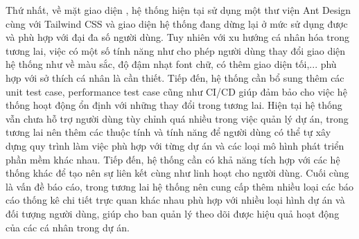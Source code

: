 \documentclass[../DoAn.tex]{subfiles}
\begin{document}
Thứ nhất, về mặt giao diện , hệ thống hiện tại sử dụng một thư viện Ant Design cùng với Tailwind CSS và giao diện hệ thống đang dừng lại ở mức
sử dụng được và phù hợp với đại đa số người dùng. Tuy nhiên với xu hướng cá nhân hóa trong tương lai, việc có một số tính năng như cho phép
người dùng thay đổi giao diện hệ thống như về màu sắc, độ đậm nhạt font chữ, có thêm giao diện tối,... phù hợp với sở thích cá nhân là cần thiết.
Tiếp đến, hệ thống cần bổ sung thêm các unit test case, performance test case cũng như CI/CD giúp đảm bảo cho việc hệ thống hoạt động ổn định
với những thay đổi trong tương lai. Hiện tại hệ thống vẫn chưa hỗ trợ người dùng tùy chỉnh quá nhiều trong việc quản lý dự án,
trong tương lai nên thêm các thuộc tính và tính năng để người dùng có thể tự xây dựng quy trình làm việc phù hợp với từng dự án và
các loại mô hình phát triển phần mềm khác nhau. Tiếp đến, hệ thống cần có khả năng tích hợp với các hệ thống khác để tạo nên sự liên kết
cùng như linh hoạt cho người dùng. Cuối cùng là vấn đề báo cáo, trong tương lai hệ thống nên cung cấp thêm nhiều loại các báo cáo thống kê
chi tiết trực quan khác nhau phù hợp với nhiều loại hình dự án và đối tượng người dùng, giúp cho ban quản lý theo dõi được hiệu quả hoạt động
của các cá nhân trong dự án.
\end{document}
